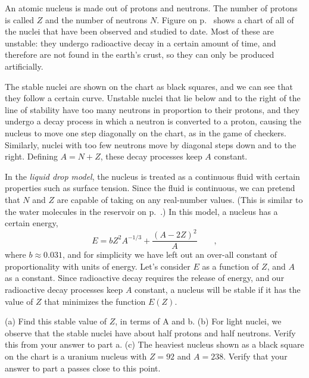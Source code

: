 An atomic nucleus is made out of protons and neutrons. The number of protons
is called $Z$ and the number of neutrons $N$. Figure 
on p.~\pageref{fig:hw-line-of-stability} shows a chart of all of the nuclei that have
been observed and studied to date. Most of these are unstable: they undergo radioactive
decay in a certain amount of time, and therefore are not found in the earth's crust,
so they can only be produced artificially.

The stable nuclei are shown on the chart
as black squares, and we can see that they follow a certain curve. Unstable nuclei
that lie below and to the right of the line of stability have too many neutrons in
proportion to their protons, and they undergo a decay process in which a neutron
is converted to a proton, causing the nucleus to move one step diagonally on the
chart, as in the game of checkers. Similarly, nuclei with too few neutrons move
by diagonal steps down and to the right. Defining $A=N+Z$, these decay processes keep
$A$ constant.

In the \emph{liquid drop model}, the nucleus is treated as a continuous fluid with
certain properties such as surface tension. Since the fluid is continuous, we can
pretend that $N$ and $Z$ are capable of taking on any real-number values. (This is similar to
the water molecules in the reservoir on p.~\pageref{fig:reservoir}.) In this model,
a nucleus has a certain energy,
\begin{equation*}
  E = bZ^2A^{-1/3}+\frac{(A-2Z)^2}{A} \qquad ,
\end{equation*}
where $b\approx0.031$, and for simplicity we have left out
an over-all constant of proportionality with units of energy.
Let's consider $E$ as a function of $Z$, and $A$ as a constant.
Since radioactive decay requires the release of energy, and our radioactive decay
processes keep $A$ constant, a nucleus will be stable if it has the value
of $Z$ that minimizes the function $E(Z)$.

(a) Find this stable value of $Z$, in terms of A and b.\answercheck\hwendpart
(b) For light nuclei, we observe that the stable nuclei have about half protons and
half neutrons. Verify this from your answer to part a.\hwendpart
(c) The heaviest nucleus shown as a black square on the chart is a uranium nucleus
with $Z=92$ and $A=238$. Verify that your answer to part a passes close to this point.
